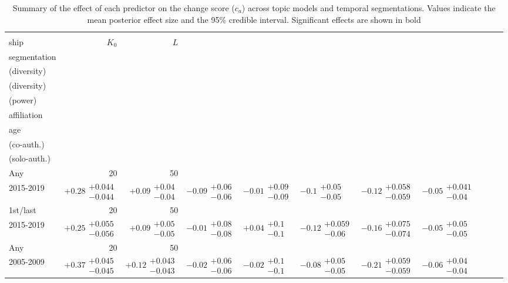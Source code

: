 \begin{table}[H]
\caption{Summary of the effect of each predictor on the change score ($c_a$) across topic models and temporal segmentations. Values indicate the mean posterior effect size and the 95\% credible interval. Significant effects are shown in bold}
\label{table:full_summary_change}
\renewcommand{\arraystretch}{2}\fontsize{6}{7}\selectfont\begin{tabular}{lrrllllllll}
\toprule
\makecell{Author-\\ ship} & $K_0$ & $L$ & \makecell{Temporal \\ segmentation} & \makecell{Intell. capital \\ (diversity)} & \makecell{Soc. capital \\ (diversity)} & \makecell{Soc. capital \\ (power)} & \makecell{Stable \\ affiliation} & \makecell{Academic \\ age} & \makecell{Prod. \\ (co-auth.)} & \makecell{Prod. \\ (solo-auth.)} \\
\midrule
Any & 20 & 50 & \makecell{2000-2009 \\ 2015-2019} & $\bm{+0.28}\substack{+0.044 \\ -0.044}$ & $\bm{+0.09}\substack{+0.04 \\ -0.04}$ & $\bm{-0.09}\substack{+0.06 \\ -0.06}$ & $-0.01\substack{+0.09 \\ -0.09}$ & $\bm{-0.1}\substack{+0.05 \\ -0.05}$ & $\bm{-0.12}\substack{+0.058 \\ -0.059}$ & $\bm{-0.05}\substack{+0.041 \\ -0.04}$ \\
1st/last & 20 & 50 & \makecell{2000-2009 \\ 2015-2019} & $\bm{+0.25}\substack{+0.055 \\ -0.056}$ & $\bm{+0.09}\substack{+0.05 \\ -0.05}$ & $-0.01\substack{+0.08 \\ -0.08}$ & $+0.04\substack{+0.1 \\ -0.1}$ & $\bm{-0.12}\substack{+0.059 \\ -0.06}$ & $\bm{-0.16}\substack{+0.075 \\ -0.074}$ & $-0.05\substack{+0.05 \\ -0.05}$ \\
Any & 20 & 50 & \makecell{2000-2004 \\ 2005-2009} & $\bm{+0.37}\substack{+0.045 \\ -0.045}$ & $\bm{+0.12}\substack{+0.043 \\ -0.043}$ & $-0.02\substack{+0.06 \\ -0.06}$ & $-0.02\substack{+0.1 \\ -0.1}$ & $\bm{-0.08}\substack{+0.05 \\ -0.05}$ & $\bm{-0.21}\substack{+0.059 \\ -0.059}$ & $\bm{-0.06}\substack{+0.04 \\ -0.04}$ \\

\end{tabular}
\end{table}
